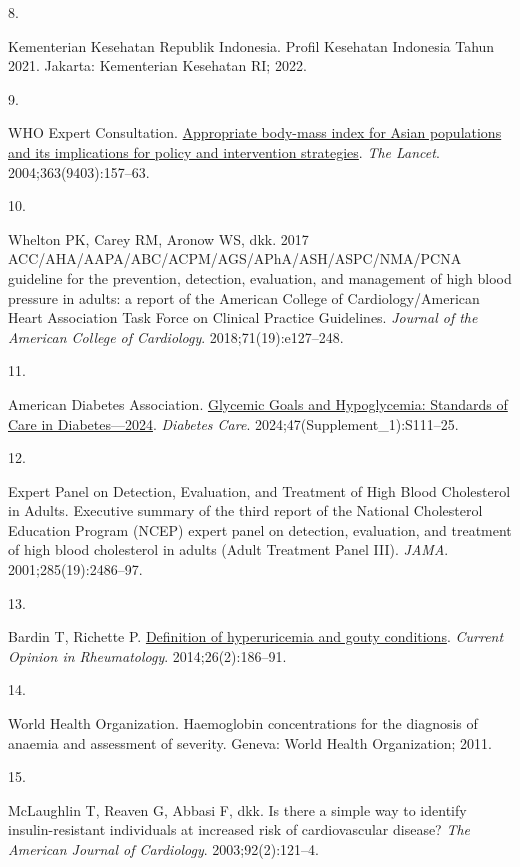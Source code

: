 \documentclass[
  indonesian,
]{agujournal2019}
\newlength{\cslhangindent}
\newlength{\csllabelwidth}
\newenvironment{CSLReferences}[2] %
 {\begin{list}{}{%
  \setlength{\itemindent}{0pt}
  \setlength{\leftmargin}{0pt}
  \setlength{\parsep}{0pt}
  \ifodd #1
   \setlength{\leftmargin}{\cslhangindent}
   \setlength{\itemindent}{-1\cslhangindent}
  \fi
  \setlength{\itemsep}{#2\baselineskip}}}
 {\end{list}}
\newcommand{\CSLLeftMargin}[1]{\parbox[t]{\csllabelwidth}{\strut#1\strut}}
\newcommand{\CSLRightInline}[1]{\parbox[t]{\linewidth - \csllabelwidth}{\strut#1\strut}}
\begin{document}
\begin{CSLReferences}{0}{1}
\CSLLeftMargin{8. }%
\CSLRightInline{Kementerian Kesehatan Republik Indonesia. Profil
Kesehatan Indonesia Tahun 2021. Jakarta: Kementerian Kesehatan RI; 2022.
}

\CSLLeftMargin{9. }%
\CSLRightInline{WHO Expert Consultation.
\href{https://doi.org/10.1016/S0140-6736(03)15268-3}{Appropriate
body-mass index for Asian populations and its implications for policy
and intervention strategies}. \emph{The Lancet}. 2004;363(9403):157--63.
}

\CSLLeftMargin{10. }%
\CSLRightInline{{Whelton PK, Carey RM, Aronow WS, dkk.} 2017
ACC/AHA/AAPA/ABC/ACPM/AGS/APhA/ASH/ASPC/NMA/PCNA guideline for the
prevention, detection, evaluation, and management of high blood pressure
in adults: a report of the American College of Cardiology/American Heart
Association Task Force on Clinical Practice Guidelines. \emph{Journal of
the American College of Cardiology}. 2018;71(19):e127--248. }

\CSLLeftMargin{11. }%
\CSLRightInline{American Diabetes Association.
\href{https://doi.org/10.2337/dc24-S006}{Glycemic Goals and
Hypoglycemia: Standards of Care in Diabetes---2024}. \emph{Diabetes
Care}. 2024;47(Supplement\_1):S111--25. }

\CSLLeftMargin{12. }%
\CSLRightInline{Expert Panel on Detection, Evaluation, and Treatment of
High Blood Cholesterol in Adults. Executive summary of the third report
of the National Cholesterol Education Program (NCEP) expert panel on
detection, evaluation, and treatment of high blood cholesterol in adults
(Adult Treatment Panel III). \emph{JAMA}. 2001;285(19):2486--97. }

\CSLLeftMargin{13. }%
\CSLRightInline{Bardin T, Richette P.
\href{https://doi.org/10.1097/BOR.0000000000000028}{Definition of
hyperuricemia and gouty conditions}. \emph{Current Opinion in
Rheumatology}. 2014;26(2):186--91. }

\CSLLeftMargin{14. }%
\CSLRightInline{World Health Organization. Haemoglobin concentrations
for the diagnosis of anaemia and assessment of severity. Geneva: World
Health Organization; 2011. }

\CSLLeftMargin{15. }%
\CSLRightInline{McLaughlin T, Reaven G, Abbasi F, dkk. Is there a simple
way to identify insulin-resistant individuals at increased risk of
cardiovascular disease? \emph{The American Journal of Cardiology}.
2003;92(2):121--4. }


\end{CSLReferences}
\end{document}
